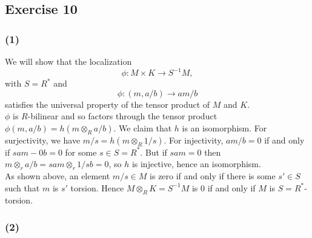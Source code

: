 \documentclass{article}
\theoremstyle{definition}
\begin{document}
\subsection*{Exercise 10}
\subsubsection*{(1)}

We will show that the localization
\[
	\phi : M \times K \to S^{-1}M,
\]
with $S = R^{*}$ and 
\[
	\phi : (m, a/b) \to am/b
\] 
satisfies the universal property of the tensor product of $M$ and $K$. \\

$\phi$ is $R$-bilinear and so factors through the tensor product $\phi(m, a/b)
= h(m \otimes_{R} a/b)$. We claim that $h$ is an isomorphism. For surjectivity,
we have $m/s = h(m \otimes_R 1/s)$. For injectivity, $am/b = 0$ if and only if
$sam - 0b = 0$ for some $s \in S = R^{*}$. But if $sam = 0$ then $m \otimes_r
a/b = sam \otimes_r 1/sb = 0$, so $h$ is injective, hence an isomorphism. \\

As shown above, an element $m/s \in M$ is zero if and only if there is some $s'
\in S$ such that $m$ is $s'$ torsion. Hence $M \otimes_R K = S^{-1}M$ is $0$ if
and only if $M$ is $S = R^{*}$-torsion.

\subsubsection*{(2)}
\end{document}
